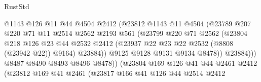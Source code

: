 \begin{lexlean}{RustStd}
\begin{coremodule}
                                    @1143
                                    @126
                                    @11
                                    @44
                                    @4504
                                    @2412
                                    (@23812
                                      @1143
                                      @11
                                      @4504
                                      (@23789
                                        @207
                                        @220
                                        @71
                                        @11
                                        @2514
                                        @2562
                                        @2193
                                        @561
                                        (@23799
                                          @220
                                          @71
                                          @2562
                                          (@23804
                                            @218
                                            @126
                                            @23
                                            @44
                                            @2532
                                            @2412
                                            (@23937 @22 @23 @22 @2532 (@8808 (@23942 @22)) @9164)
                                            @23884))
                                        @9125
                                        @9128
                                        @9131
                                        @9134
                                        @8478))
                                    @23884)))
                              @8487
                              @8490
                              @8493
                              @8496
                              @8478))
                          (@23804
                            @169
                            @126
                            @41
                            @44
                            @2461
                            @2412
                            (@23812
                              @169
                              @41
                              @2461
                              (@23817
                                @166
                                @41
                                @126
                                @44
                                @2514
                                @2412

\end{coremodule}
\end{lexlean}
